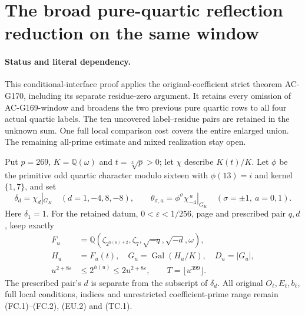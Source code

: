 \section{The broad pure-quartic reflection reduction on the same window}
\label{sec:quartic-abelian-reflection-actual-window}

\paragraph{Status and literal dependency.}
This conditional-interface proof applies the original-coefficient
strict theorem AC-G170, including its separate residue-zero argument.
It retains every omission of AC-G169-window and broadens the two
previous pure quartic rows to all four actual quartic labels.
The ten uncovered label--residue pairs are retained in the unknown sum.
One full local comparison cost covers the entire enlarged union.
The remaining all-prime estimate and mixed realization stay open.

Put $p=269$, $K=\mathbb Q(\omega)$ and $t=\sqrt[3]p>0$;
let $\chi$ describe $K(t)/K$.
Let $\phi$ be the primitive odd quartic character modulo sixteen
with $\phi(13)=i$ and kernel $\{1,7\}$, and set
\[
 \delta_d=\chi_d|_{G_K}\quad(d=1,-4,8,-8),\qquad
 \theta_{\sigma,a}=\phi^\sigma\chi_{-4}^{\,a}|_{G_K}
                    \quad(\sigma=\pm1,\ a=0,1).
 \tag{QRW.1}
\]
Here $\delta_1=1$.
For the retained datum, $0<\varepsilon<1/256$, page and
prescribed pair $q,d$, keep exactly
\[
 \begin{aligned}
 F_u&=\mathbb Q(\zeta_{2^{h(u)+2}},\zeta_7,
                                  \sqrt{-q},\sqrt{-d},\omega),\\
 H_u&=F_u(t),\quad G_u=\operatorname{Gal}(H_u/K),\quad D_u=|G_u|,\\
 u^{2+8\varepsilon}&\leq2^{h(u)}\leq2u^{2+8\varepsilon},
                    \qquad T=\lfloor u^{399}\rfloor .
 \end{aligned}
 \tag{QRW.2}
\]
The prescribed pair's $d$ is separate from the subscript of $\delta_d$.
All original $O_\ell,E_\ell,b_\ell$, full local conditions,
indices and unrestricted coefficient-prime range remain (FC.1)--(FC.2),
(EU.2) and (TC.1).

